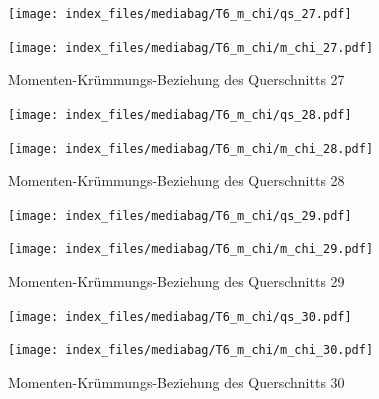 \documentclass[
  11pt,
  letterpaper,
]{scrreprt}
\begin{document}
\begin{figure}[H]

\begin{minipage}{0.50\linewidth}
\texttt{[image: index\_files/mediabag/T6\_m\_chi/qs\_27.pdf]}\end{minipage}%
%
\begin{minipage}{0.50\linewidth}
\texttt{[image: index\_files/mediabag/T6\_m\_chi/m\_chi\_27.pdf]}\end{minipage}%

\caption{\label{fig-mchi_anhang}Momenten-Krümmungs-Beziehung des
Querschnitts 27}

\end{figure}%

\begin{figure}[H]

\begin{minipage}{0.50\linewidth}
\texttt{[image: index\_files/mediabag/T6\_m\_chi/qs\_28.pdf]}\end{minipage}%
%
\begin{minipage}{0.50\linewidth}
\texttt{[image: index\_files/mediabag/T6\_m\_chi/m\_chi\_28.pdf]}\end{minipage}%

\caption{\label{fig-mchi_anhang}Momenten-Krümmungs-Beziehung des
Querschnitts 28}

\end{figure}%

\begin{figure}[H]

\begin{minipage}{0.50\linewidth}
\texttt{[image: index\_files/mediabag/T6\_m\_chi/qs\_29.pdf]}\end{minipage}%
%
\begin{minipage}{0.50\linewidth}
\texttt{[image: index\_files/mediabag/T6\_m\_chi/m\_chi\_29.pdf]}\end{minipage}%

\caption{\label{fig-mchi_anhang}Momenten-Krümmungs-Beziehung des
Querschnitts 29}

\end{figure}%

\begin{figure}[H]

\begin{minipage}{0.50\linewidth}
\texttt{[image: index\_files/mediabag/T6\_m\_chi/qs\_30.pdf]}\end{minipage}%
%
\begin{minipage}{0.50\linewidth}
\texttt{[image: index\_files/mediabag/T6\_m\_chi/m\_chi\_30.pdf]}\end{minipage}%

\caption{\label{fig-mchi_anhang}Momenten-Krümmungs-Beziehung des
Querschnitts 30}

\end{figure}%
\end{document}
